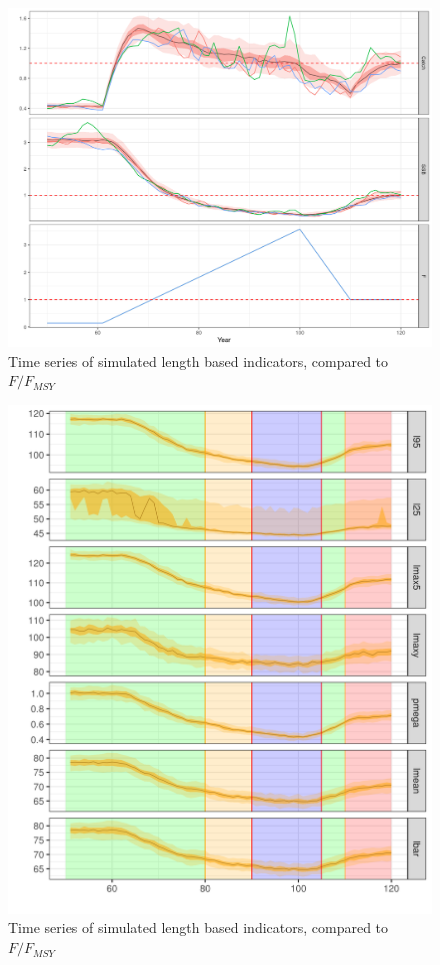 \begin{figure}[h!]\centering
\includegraphics[width=\textwidth]{figs/roc-finalts-pollack-1.png}
\caption{Time series of simulated length based indicators, compared to $F/F_{MSY}$}
\label{fig:ompollack}
\end{figure}

\begin{figure}[h!]\centering
\includegraphics[width=\textwidth]{figs/roc-finalinds-1.png}
\caption{Time series of simulated length based indicators, compared to $F/F_{MSY}$}
\label{fig:libsim}
\end{figure}

